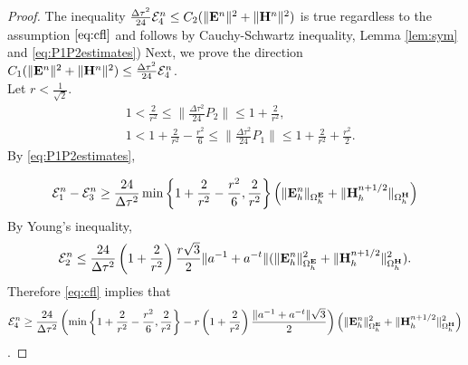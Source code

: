 \documentclass[12pt,reqno]{amsart}
\newcommand{\e}{{\bf E}}
\newcommand{\h}{{\bf H}}
\theoremstyle{definition}
\numberwithin{equation}{section}
\def\Gwh{\Omega_h}
\begin{document}
\begin{proof}
	The inequality $\frac{\Delta \tau^2}{24}\mathcal{E}_4^n\leq C_2(\|\e^n\|^2+\|\h^n\|^2) $ is true regardless to the assumption $\eqref{eq:cfl}$ and follows by Cauchy-Schwartz inequality,  Lemma \ref{lem:sym} and \eqref{eq:P1P2estimates})
	Next, we  prove the direction 
	$ C_1(\|\e^n\|^2+\|\h^n\|^2)\leq \frac{\Delta \tau^2}{24}\mathcal{E}_4^n$.\\
Let $r<\frac{1}{\sqrt{2}}$.
\begin{align}
	&
	1<\frac{2}{r^2}\leq \|\frac{\Delta \tau^2}{24}P_2\|\leq 1+\frac{2}{r^2},\\&
	1<1+\frac{2}{r^2}-\frac{r^2}{6}\leq\|\frac{\Delta \tau^2}{24}P_1\|\leq 1+\frac{2}{r^2}+\frac{r^2}{2}.
\end{align} 
By \eqref{eq:P1P2estimates}, 


$$\mathcal{E}_1^n-\mathcal{E}_3^n\geq
\frac{24}{\Delta \tau^2}
\min\left \{    
1+\frac{2}{r^2}-\frac{r^2}{6},\frac{2}{r^2}
\right\}
\left ( \|\e_h^n\|_{\Gwh^\e}+\|\h_h^{n+1/2}\|_{\Gwh^\h}\right)$$
By Young's inequality,
$$
\mathcal{E}_2^n\leq \frac{24}{\Delta \tau^2}
\left(1+\frac{2}{r^2}\right)
\frac{r\sqrt{3}}{2}\|a^{-1}+a^{-t}\|(\|\e_h^n\|^2_{\Gwh^\e}+\|\h_h^{n+1/2}\|^2_{\Gwh^\h}).
$$
Therefore \eqref{eq:cfl} implies that
 $$\mathcal{E}_4^n\geq
 \frac{24}{\Delta \tau^2} 
 \left(
 \min\left \{    
 1+\frac{2}{r^2}-\frac{r^2}{6},\frac{2}{r^2}
 \right\}-r\left(1+\frac{2}{r^2}\right)\frac{\|a^{-1}+a^{-t}\|\sqrt{3}}{2}
 \right)
 \left ( \|\e_h^n\|^2_{\Gwh^\e}+\|\h_h^{n+1/2}\|^2_{\Gwh^\h}\right)$$.
\end{proof}
\end{document}
